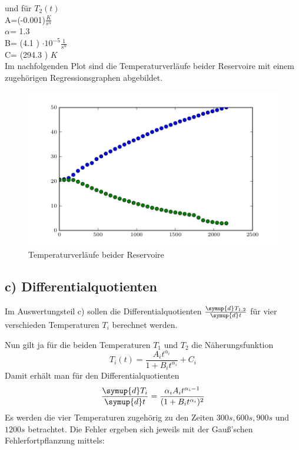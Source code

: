 und für $T_2(t)$\\

A=(-0.001)$\frac{K}{s^\alpha}$ \\
$\alpha$= 1.3  \\
B= (4.1 ) $\cdot 10^{-5}\frac{1}{s^\alpha}$\\
C= (294.3 ) $K$ \\

Im nachfolgenden Plot sind die Temperaturverläufe beider Reservoire mit einem zugehörigen Regressionsgraphen abgebildet.

\begin{figure}
  \centering
  \includegraphics{build/plot.pdf}
  \caption{Temperaturverläufe beider Reservoire}
  \label{fig:temperaturverlauf}
\end{figure}


\subsection{c) Differentialquotienten}
Im Auswertungsteil c) sollen die Differentialquotienten $\frac{\symup{d}T_{1,2}}{\symup{d}t}$
für vier verschieden Temperaturen $T_i$ berechnet werden.

Nun gilt ja für die beiden Temperaturen $T_1$ und $T_2$ die Näherungsfunktion
\begin{equation}
	T_i(t) = \frac{A_i t^{\alpha_i}}{1 + B_i t^{\alpha_i}} + C_i
\end{equation}
Damit erhält man für den Differentialquotienten
\begin{equation}
	\frac{\symup{d}T_i}{\symup{d}t} = \frac{\alpha_i A_i t^{\alpha_i - 1}}{(1 + B_i t^{\alpha_i})^2}
\end{equation}
Es werden die vier Temperaturen zugehörig zu den Zeiten $300s, 600s, 900s$ und $1200s$ betrachtet.
Die Fehler ergeben sich jeweils mit der Gauß'schen Fehlerfortpflanzung mittels:


